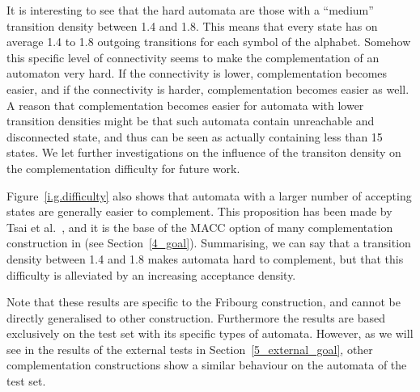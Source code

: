 It is interesting to see that the hard automata are those with a ``medium'' transition density between 1.4 and 1.8. This means that every state has on average 1.4 to 1.8 outgoing transitions for each symbol of the alphabet. Somehow this specific level of connectivity seems to make the complementation of an automaton very hard. If the connectivity is lower, complementation becomes easier, and if the connectivity is harder, complementation becomes easier as well. A reason that complementation becomes easier for automata with lower transition densities might be that such automata contain unreachable and disconnected state, and thus can be seen as actually containing less than 15 states. We let further investigations on the influence of the transiton density on the complementation difficulty for future work.

Figure~\ref{i.g.difficulty} also shows that automata with a larger number of accepting states are generally easier to complement. This proposition has been made by Tsai et al.~\cite{2011_tsai}, and it is the base of the MACC option of many complementation construction in \goal{} (see Section~\ref{4_goal}). Summarising, we can say that a transition density between 1.4 and 1.8 makes automata hard to complement, but that this difficulty is alleviated by an increasing acceptance density.

Note that these results are specific to the Fribourg construction, and cannot be directly generalised to other construction. Furthermore the results are based exclusively on the \goal{} test set with its specific types of automata. However, as we will see in the results of the external tests in Section~\ref{5_external_goal}, other complementation constructions show a similar behaviour on the automata of the \goal{} test set.



